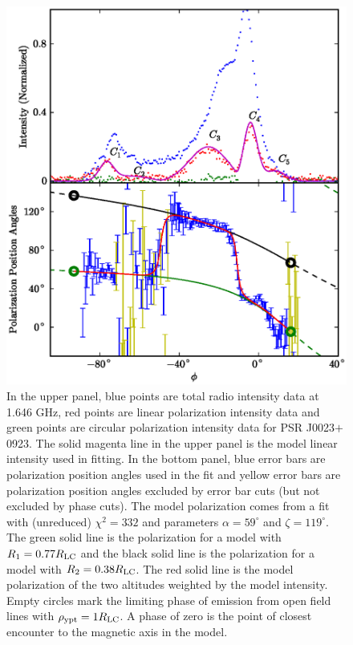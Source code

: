 \begin{figure}[htbp]
\begin{center}
\includegraphics[scale=.8]{chapters/applicationOfNumericalModel/figures/intAndPAJ0023alpha59zeta119.eps}
\caption[Intensity and polarization data for PSR J0023$+$0923 overlaid with model]{\label{fig:PlotJ0023intPA}
In the upper panel, blue points are total radio intensity data at 1.646 GHz, red points are linear polarization intensity data
and green points are circular polarization intensity data for PSR J0023$+$0923.  The solid magenta line in the upper panel is
the model linear intensity used in fitting.  In the bottom panel, blue error bars are polarization position angles
used in the fit and yellow error bars are polarization position angles excluded by error bar cuts (but not 
excluded by phase cuts).  The model polarization comes from
a fit with (unreduced) $\chi^2=332$ and parameters $\alpha=59^{\circ}$ and $\zeta=119^{\circ}$.  The green solid line is the polarization for
a model with $R_{1}=0.77R_{\rm{LC}}$ and the black solid line is the polarization for 
a model with $R_{2}=0.38R_{\rm{LC}}$.  The red solid line is the model
polarization of the two altitudes weighted by the model intensity. Empty circles mark the limiting phase of emission from
open field lines with $\rho_{\rm{ypt}}=1R_{\rm{LC}}$. A phase of zero is the point
of closest encounter to the magnetic axis in the model.
}
\end{center}
\end{figure}


